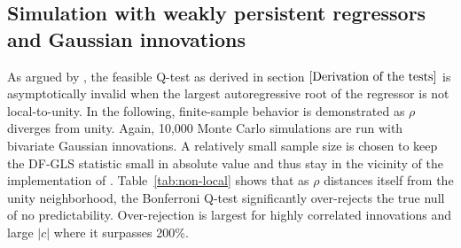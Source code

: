 \documentclass[11pt, a4paper]{article}
\begin{document}
\subsection{Simulation with weakly persistent regressors and Gaussian innovations}
\label{Simulation with weakly persistent regressors and Gaussian innovations}
As argued by \citet{phillips2014confidence}, the feasible Q-test as derived in section $\ref{Derivation of the tests}$ is asymptotically invalid when the largest autoregressive root of the regressor is not local-to-unity. In the following, finite-sample behavior is demonstrated as $\rho$ diverges from unity. Again, 10,000 Monte Carlo simulations are run with bivariate Gaussian innovations. A relatively small sample size is chosen to keep the DF-GLS statistic small in absolute value and thus stay in the vicinity of the implementation of \citet{campbell2005implementing}. Table~\vref{tab:non-local} shows that as $\rho$ distances itself from the unity neighborhood, the Bonferroni Q-test significantly over-rejects the true null of no predictability. Over-rejection is largest for highly correlated innovations and large $|c|$ where it surpasses 200\%.
\end{document}
